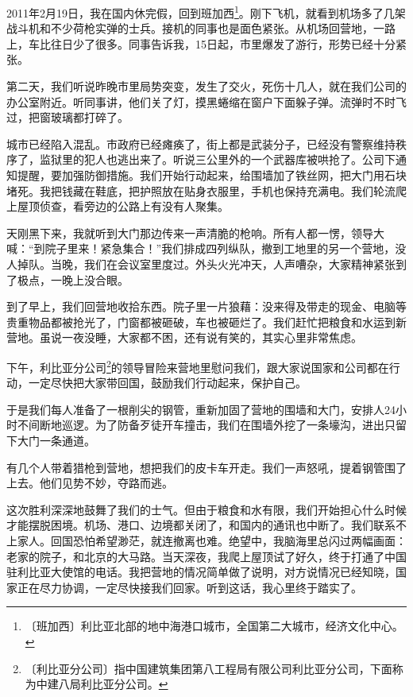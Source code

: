 \documentclass[12pt,UTF-8,openany]{ctexbook}
\begin{document}
\begin{large}
    
    2011年2月19日，我在国内休完假，回到班加西\footnote{〔班加西〕利比亚北部的地中海港口城市，全国第二大城市，经济文化中心。}。刚下飞机，就看到机场多了几架战斗机和不少荷枪实弹的士兵。接机的同事也是面色紧张。从机场回营地，一路上，车比往日少了很多。同事告诉我，15日起，市里爆发了游行，形势已经十分紧张。
    
    第二天，我们听说昨晚市里局势突变，发生了交火，死伤十几人，就在我们公司的办公室附近。听同事讲，他们关了灯，摸黑蜷缩在窗户下面躲子弹。流弹时不时飞过，把窗玻璃都打碎了。
    
    城市已经陷入混乱。市政府已经瘫痪了，街上都是武装分子，已经没有警察维持秩序了，监狱里的犯人也逃出来了。听说三公里外的一个武器库被哄抢了。公司下通知提醒，要加强防御措施。我们开始行动起来，给围墙加了铁丝网，把大门用石块堵死。我把钱藏在鞋底，把护照放在贴身衣服里，手机也保持充满电。我们轮流爬上屋顶侦查，看旁边的公路上有没有人聚集。
    
    天刚黑下来，我就听到大门那边传来一声清脆的枪响。所有人都一愣，领导大喊：“到院子里来！紧急集合！”我们排成四列纵队，撤到工地里的另一个营地，没人掉队。当晚，我们在会议室里度过。外头火光冲天，人声嘈杂，大家精神紧张到了极点，一晚上没合眼。
    
    到了早上，我们回营地收拾东西。院子里一片狼藉：没来得及带走的现金、电脑等贵重物品都被抢光了，门窗都被砸破，车也被砸烂了。我们赶忙把粮食和水运到新营地。虽说一夜没睡，大家都不困，还有说有笑的，其实心里非常焦虑。
    
    下午，利比亚分公司\footnote{〔利比亚分公司〕指中国建筑集团第八工程局有限公司利比亚分公司，下面称为中建八局利比亚分公司。}的领导冒险来营地里慰问我们，跟大家说国家和公司都在行动，一定尽快把大家带回国，鼓励我们行动起来，保护自己。
    
    于是我们每人准备了一根削尖的钢管，重新加固了营地的围墙和大门，安排人24小时不间断地巡逻。为了防备歹徒开车撞击，我们在围墙外挖了一条壕沟，进出只留下大门一条通道。
    
    有几个人带着猎枪到营地，想把我们的皮卡车开走。我们一声怒吼，提着钢管围了上去。他们见势不妙，夺路而逃。
    
    这次胜利深深地鼓舞了我们的士气。但由于粮食和水有限，我们开始担心什么时候才能摆脱困境。机场、港口、边境都关闭了，和国内的通讯也中断了。我们联系不上家人。回国恐怕希望渺茫，就连撤离也难。绝望中，我脑海里总闪过两幅画面：老家的院子，和北京的大马路。当天深夜，我爬上屋顶试了好久，终于打通了中国驻利比亚大使馆的电话。我把营地的情况简单做了说明，对方说情况已经知晓，国家正在尽力协调，一定尽快接我们回家。听到这话，我心里终于踏实了。
    

\end{large}
\end{document}
